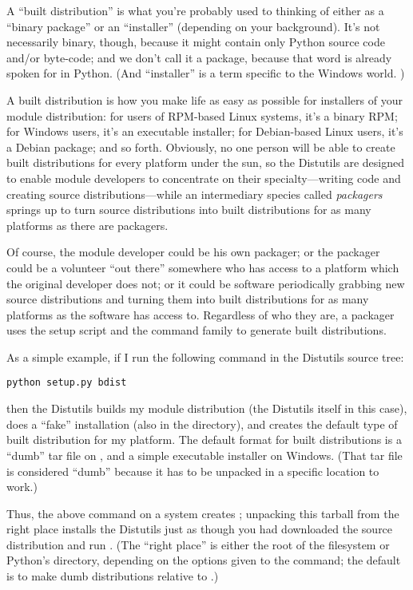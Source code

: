 \documentclass{howto}
\begin{document}
A ``built distribution'' is what you're probably used to thinking of
either as a ``binary package'' or an ``installer'' (depending on your
background).  It's not necessarily binary, though, because it might
contain only Python source code and/or byte-code; and we don't call it a
package, because that word is already spoken for in Python.  (And
``installer'' is a term specific to the Windows world.  )

A built distribution is how you make life as easy as possible for
installers of your module distribution: for users of RPM-based Linux
systems, it's a binary RPM; for Windows users, it's an executable
installer; for Debian-based Linux users, it's a Debian package; and so
forth.  Obviously, no one person will be able to create built
distributions for every platform under the sun, so the Distutils are
designed to enable module developers to concentrate on their
specialty---writing code and creating source distributions---while an
intermediary species called \emph{packagers} springs up to turn source
distributions into built distributions for as many platforms as there
are packagers.

Of course, the module developer could be his own packager; or the
packager could be a volunteer ``out there'' somewhere who has access to
a platform which the original developer does not; or it could be
software periodically grabbing new source distributions and turning them
into built distributions for as many platforms as the software has
access to.  Regardless of who they are, a packager uses the
setup script and the  command family to generate built
distributions.

As a simple example, if I run the following command in the Distutils
source tree:

\begin{verbatim}
python setup.py bdist
\end{verbatim}

then the Distutils builds my module distribution (the Distutils itself
in this case), does a ``fake'' installation (also in the 
directory), and creates the default type of built distribution for my
platform.  The default format for built distributions is a ``dumb'' tar
file on \UNIX, and a simple executable installer on Windows.  (That tar
file is considered ``dumb'' because it has to be unpacked in a specific
location to work.)

Thus, the above command on a \UNIX{} system creates
; unpacking this tarball
from the right place installs the Distutils just as though you had
downloaded the source distribution and run .  (The ``right place'' is either the root of the filesystem or 
Python's  directory, depending on the options given to
the  command; the default is to make dumb
distributions relative to .)  
\end{document}
